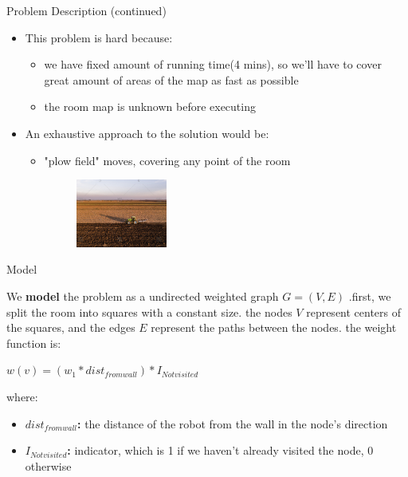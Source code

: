 \documentclass[10pt]{beamer}
\begin{document}
\begin{frame}{Problem Description (continued)}
\begin{itemize}
    \item This problem is hard because: 
    \begin{itemize}
    \item we have fixed amount of running time(4 mins), so we'll have to cover great amount of areas of the map as fast as possible
    \item the room map is unknown before executing
\end{itemize}
    \item An exhaustive approach to the solution would be:
    \begin{itemize}
    \item "plow field" moves, covering any point of the room
    \begin{figure}[t]
		\centering
		\includegraphics[width=0.3\textwidth]{images/plow.jpg}
    \end{figure}\hfill
\end{itemize}
\end{itemize}
\end{frame}


\begin{frame}{Model}

We {\bf model} the problem as a undirected weighted graph $G=(V, E)$ .first, we split the room into squares with a constant size. the nodes $V$ represent centers of the squares, and the edges $E$ represent the paths between the nodes.
the weight function is: 
\begin{itemize}
$w(v) = (w_1*dist_{from wall})*I_{Notvisited} $
\end{itemize}
where:
\begin{itemize}
\begin{itemize}
    \item {\bf $dist_{from wall}$:} { the distance of the robot from the wall in the node's direction}    
\end{itemize}
\begin{itemize}
    \item {\bf $I_{Notvisited} $:} { indicator, which is 1 if we haven't already visited the node, 0 otherwise}    
\end{itemize}
\end{itemize}
\end{frame}
\end{document}
